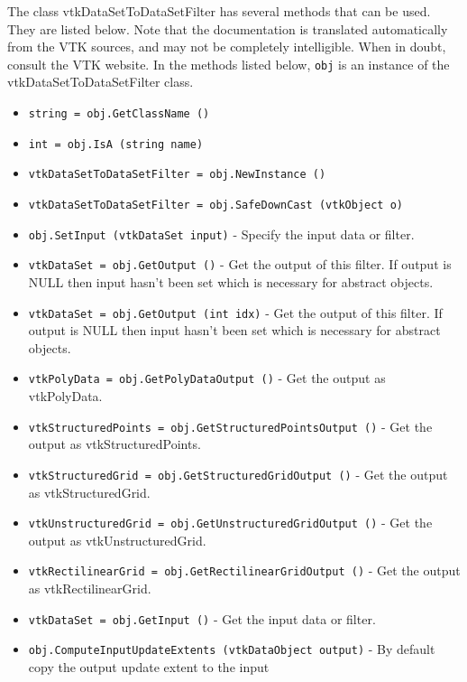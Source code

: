 The class vtkDataSetToDataSetFilter has several methods that can be used.
  They are listed below.
Note that the documentation is translated automatically from the VTK sources,
and may not be completely intelligible.  When in doubt, consult the VTK website.
In the methods listed below, \verb|obj| is an instance of the vtkDataSetToDataSetFilter class.
\begin{itemize}
\item  \verb|string = obj.GetClassName ()|

\item  \verb|int = obj.IsA (string name)|

\item  \verb|vtkDataSetToDataSetFilter = obj.NewInstance ()|

\item  \verb|vtkDataSetToDataSetFilter = obj.SafeDownCast (vtkObject o)|

\item  \verb|obj.SetInput (vtkDataSet input)| -  Specify the input data or filter.

\item  \verb|vtkDataSet = obj.GetOutput ()| -  Get the output of this filter. If output is NULL then input
 hasn't been set which is necessary for abstract objects.

\item  \verb|vtkDataSet = obj.GetOutput (int idx)| -  Get the output of this filter. If output is NULL then input
 hasn't been set which is necessary for abstract objects.

\item  \verb|vtkPolyData = obj.GetPolyDataOutput ()| -  Get the output as vtkPolyData.

\item  \verb|vtkStructuredPoints = obj.GetStructuredPointsOutput ()| -  Get the output as vtkStructuredPoints.

\item  \verb|vtkStructuredGrid = obj.GetStructuredGridOutput ()| -  Get the output as vtkStructuredGrid.

\item  \verb|vtkUnstructuredGrid = obj.GetUnstructuredGridOutput ()| -  Get the output as vtkUnstructuredGrid.

\item  \verb|vtkRectilinearGrid = obj.GetRectilinearGridOutput ()| -  Get the output as vtkRectilinearGrid. 

\item  \verb|vtkDataSet = obj.GetInput ()| -  Get the input data or filter.

\item  \verb|obj.ComputeInputUpdateExtents (vtkDataObject output)| -  By default copy the output update extent to the input

\end{itemize}
